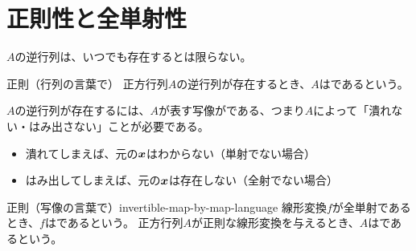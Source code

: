 \documentclass[../../../topic_linear-algebra]{subfiles}
\begin{document}
\sectionline
\section{正則性と全単射性}

$A$の逆行列は、いつでも存在するとは限らない。

\begin{definition*}{正則（行列の言葉で）}
  正方行列$A$の逆行列が存在するとき、$A$はであるという。
\end{definition*}

\br

$A$の逆行列が存在するには、$A$が表す写像がである、つまり$A$によって「潰れない・はみ出さない」ことが必要である。

\begin{itemize}
  \item 潰れてしまえば、元の$\vb*{x}$はわからない（単射でない場合）
  \item はみ出してしまえば、元の$\vb*{x}$は存在しない（全射でない場合）
\end{itemize}

\begin{definition}{正則（写像の言葉で）}{invertible-map-by-map-language}
  線形変換$f$が全単射であるとき、$f$はであるという。
  正方行列$A$が正則な線形変換を与えるとき、$A$はであるという。
\end{definition}
\end{document}
